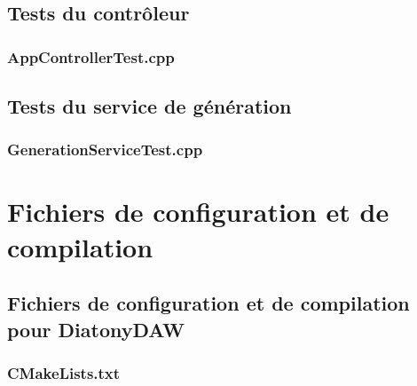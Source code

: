 \newpage
\section{Tests du contrôleur}

\subsection{AppControllerTest.cpp}


\newpage
\section{Tests du service de génération}

\subsection{GenerationServiceTest.cpp}

\chapter{Fichiers de configuration et de compilation}

\section{Fichiers de configuration et de compilation pour DiatonyDAW}

\subsection{CMakeLists.txt}


